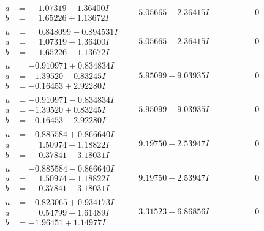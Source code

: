 \documentclass[1p]{elsarticle_modified}
\theoremstyle{definition}
\begin{document}
$$\begin{array}{c|c|c}
\begin{aligned}
a &= \phantom{-}1.07319 - 1.36400 I \\
b &= \phantom{-}1.65226 + 1.13672 I\end{aligned}
 & \phantom{-}5.05665 + 2.36415 I & \phantom{-0.000000 } 0 \\ \hline\begin{aligned}
u &= \phantom{-}0.848099 - 0.894531 I \\
a &= \phantom{-}1.07319 + 1.36400 I \\
b &= \phantom{-}1.65226 - 1.13672 I\end{aligned}
 & \phantom{-}5.05665 - 2.36415 I & \phantom{-0.000000 } 0 \\ \hline\begin{aligned}
u &= -0.910971 + 0.834834 I \\
a &= -1.39520 - 0.83245 I \\
b &= -0.16453 + 2.92280 I\end{aligned}
 & \phantom{-}5.95099 + 9.03935 I & \phantom{-0.000000 } 0 \\ \hline\begin{aligned}
u &= -0.910971 - 0.834834 I \\
a &= -1.39520 + 0.83245 I \\
b &= -0.16453 - 2.92280 I\end{aligned}
 & \phantom{-}5.95099 - 9.03935 I & \phantom{-0.000000 } 0 \\ \hline\begin{aligned}
u &= -0.885584 + 0.866640 I \\
a &= \phantom{-}1.50974 + 1.18822 I \\
b &= \phantom{-}0.37841 - 3.18031 I\end{aligned}
 & \phantom{-}9.19750 + 2.53947 I & \phantom{-0.000000 } 0 \\ \hline\begin{aligned}
u &= -0.885584 - 0.866640 I \\
a &= \phantom{-}1.50974 - 1.18822 I \\
b &= \phantom{-}0.37841 + 3.18031 I\end{aligned}
 & \phantom{-}9.19750 - 2.53947 I & \phantom{-0.000000 } 0 \\ \hline\begin{aligned}
u &= -0.823065 + 0.934173 I \\
a &= \phantom{-}0.54799 - 1.61489 I \\
b &= -1.96451 + 1.14977 I\end{aligned}
 & \phantom{-}3.31523 - 6.86856 I & \phantom{-0.000000 } 0 \\ \hline\begin{aligned}

\end{aligned}
\end{array}$$
\end{document}
